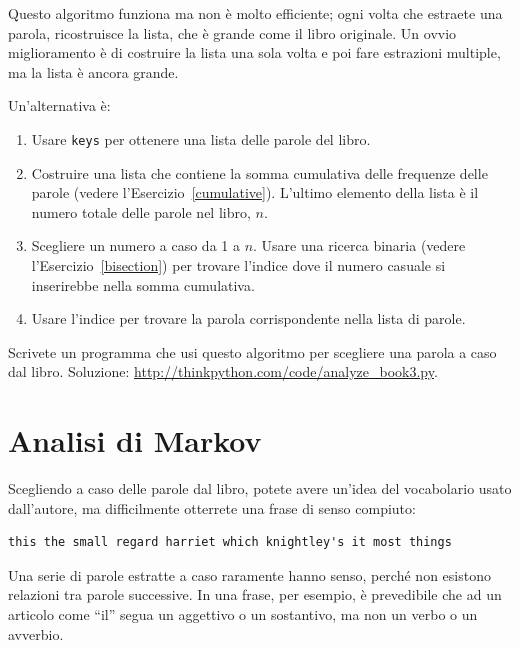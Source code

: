 \documentclass[10pt]{book}
\begin{document}
\vspace{0.2in}
\begin{exercise}
\label{randhist}

Questo algoritmo funziona ma non è molto efficiente; ogni volta che estraete una parola, ricostruisce la lista, che è grande come il libro originale. Un ovvio miglioramento è di costruire la lista una sola volta e poi fare estrazioni multiple, ma la lista è ancora grande.

Un'alternativa è:

\begin{enumerate}

\item Usare {\tt keys} per ottenere una lista delle parole del libro.

\item Costruire una lista che contiene la somma cumulativa delle frequenze delle parole (vedere l'Esercizio~\ref{cumulative}).  L'ultimo elemento della lista è il numero totale delle parole nel libro, $n$.
  
\item Scegliere un numero a caso da 1 a $n$.  Usare una ricerca binaria
  (vedere l'Esercizio~\ref{bisection}) per trovare l'indice dove il numero casuale si inserirebbe nella somma cumulativa.

\item Usare l'indice per trovare la parola corrispondente nella lista di parole.

\end{enumerate}

Scrivete un programma che usi questo algoritmo per scegliere una parola a caso dal libro. Soluzione: \url{http://thinkpython.com/code/analyze_book3.py}.

\end{exercise}



\section{Analisi di Markov}
\label{markov}

Scegliendo a caso delle parole dal libro, potete avere un'idea del vocabolario usato dall'autore, ma difficilmente otterrete una frase di senso compiuto:

\begin{verbatim}
this the small regard harriet which knightley's it most things
\end{verbatim}
%
Una serie di parole estratte a caso raramente hanno senso, perché non esistono relazioni tra parole successive. In una frase, per esempio, è prevedibile che ad un articolo come ``il'' segua un aggettivo o un sostantivo, ma non un verbo o un avverbio.
\end{document}
